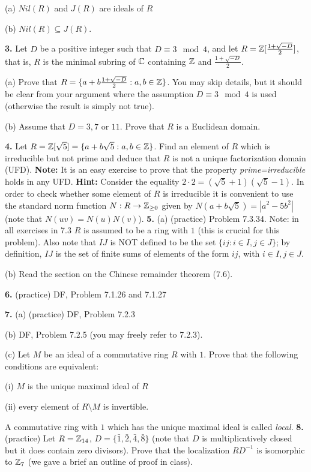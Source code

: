 \documentclass[12pt]{article}
\begin{document}
(a) $Nil(R)$ and $J(R)$ are ideals of $R$ 

(b) $Nil(R)\subseteq J(R)$.
\skv

{\bf 3.} Let $D$ be a positive integer such that $D\equiv 3\mod 4$, and let
$R={\mathbb Z}[\frac{1+\sqrt{-D}}{2}]$, that is, $R$ is the minimal subring of ${\mathbb C}$ containing ${\mathbb Z}$ and $\frac{1+\sqrt{-D}}{2}$.

(a) Prove that $R=\{a+ b \frac{1+\sqrt{-D}}{2} : a,b\in{\mathbb Z} \}$. You may skip details, but it should
be clear from your argument where the assumption $D\equiv 3\mod 4$ is used (otherwise the result is simply not true).

(b) Assume that $D=3, 7$ or $11$. Prove that $R$ is a Euclidean domain.
\skv

{\bf 4.} Let $R={\mathbb Z}[\sqrt{5}]=\{a+b\sqrt{5} : a,b\in{\mathbb Z}\}$. Find an element of $R$
which is irreducible but not prime and deduce that $R$ is not a unique factorization domain (UFD).
{\bf Note:} It is an easy exercise to prove that the property {\it prime=irreducible} holds in any UFD.
 {\bf Hint:} Consider the equality $2\cdot 2=(\sqrt{5}+1)(\sqrt{5}-1)$. In order to check
whether some element of $R$ is irreducible it is convenient to use the standard norm function
$N:R\to{\mathbb Z}_{\geq 0}$ given by $N(a+b\sqrt{5})=|a^2-5b^2|$ (note that $N(uv)=N(u)N(v)$).
\skv
{\bf 5.} (a) (practice) Problem 7.3.34. Note: in all exercises in 7.3 $R$ is assumed to be a ring  
with $1$ (this is crucial for this problem). Also note that $IJ$ is NOT defined to be the set 
$\{ij: i\in I, j\in J\}$;  by definition, $IJ$ is the set of finite sums of elements of the form 
$ij$, with $i\in I, j\in J$.  

(b) Read the section on the Chinese remainder theorem (7.6).

\skv
{\bf 6.} (practice) DF, Problem 7.1.26 and 7.1.27

\skv
{\bf 7.} (a) (practice) DF, Problem 7.2.3

(b) DF, Problem 7.2.5 (you may freely refer to 7.2.3).

(c) Let $M$ be an ideal of a commutative ring $R$ with $1$. Prove that the following conditions are equivalent:

\sk (i) $M$ is the unique maximal ideal of $R$ 

\sk (ii) every element of $R\setminus M$ is invertible. 

A commutative ring with $1$ which has the unique maximal ideal is called {\it local}.
\skv
{\bf 8.} (practice) Let $R={\mathbb Z}_{14}$, $D=\{\bar 1,\bar 2,\bar 4,\bar 8\}$ (note that $D$ is multiplicatively closed
but it does contain zero divisors). Prove that the localization $RD^{-1}$ is isomorphic to ${\mathbb Z}_{7}$ (we gave a brief an outline of proof in class).
\end{document}
